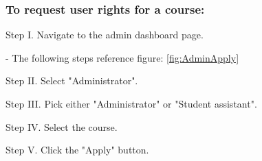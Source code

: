 \subsubsection{To request user rights for a course:}
\begin{userManualItemlist}
    \item[Step I.] Navigate to the admin dashboard page.
    \item[-] The following steps reference figure: \ref{fig:AdminApply} 
    \item[Step II.] Select "Administrator".
    \item[Step III.] Pick either "Administrator" or "Student assistant".
    \item[Step IV.] Select the course.
    \item[Step V.] Click the "Apply" button.   
\end{userManualItemlist}

